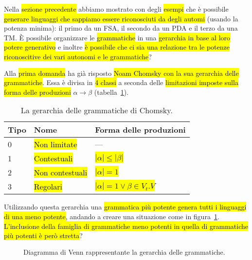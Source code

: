 \documentclass[a4paper,11pt,oneside]{article}
\theoremstyle{plain}
\theoremstyle{definition}
\theoremstyle{remark}
\begin{document}
Nella \hl{sezione precedente} abbiamo mostrato con degli \hl{esempi} che è
possibile \hl{generare linguaggi che sappiamo essere riconosciuti da degli
automi} (usando la potenza minima): il primo da un FSA, il secondo da un PDA e
il terzo da una TM\@. È possibile organizzare le \hl{grammatiche} in una
\hl{gerarchia in base al loro potere generativo} e inoltre \hl{è possibile che
ci sia una relazione tra le potenze riconoscitive dei vari autonomi e le
grammatiche}?

Alla \hl{prima domanda} ha già risposto \hl{Noam Chomsky con la sua gerarchia
delle grammatiche}. Essa è divisa in \hl{4 classi} a seconda delle
\hl{limitazioni imposte sulla forma delle produzioni} $\alpha \to \beta$
(tabella~\ref{tab:gerarchia-grammatiche}).

\begin{table}[htb]
  \centering
  \begin{tabular}{lll}
    \toprule
    Tipo & Nome            & Forma delle produzioni \\
    \midrule
    0    & \hl{Non limitate}    & --- \\
    1    & \hl{Contestuali}     & \hl{$|\alpha| \leq |\beta|$} \\
    2    & \hl{Non contestuali} & \hl{$|\alpha| = 1$} \\
    3    & \hl{Regolari}        & \hl{$|\alpha| = 1 \vee \beta \in V_t . V$} \\
    \bottomrule
  \end{tabular}
  \caption{La gerarchia delle grammatiche di Chomsky.}%
  \label{tab:gerarchia-grammatiche}
\end{table}

Utilizzando questa gerarchia una \hl{grammatica più potente genera tutti i
linguaggi di una meno potente}, andando a creare una situazione come in
figura~\ref{fig:gerarchia-grammatiche}. \hl{L'inclusione della famiglia di
grammatiche meno potenti in quella di grammatiche più potenti è però stretta}?

\begin{figure}[htb]
  \centering
  \caption{Diagramma di Venn rappresentante la gerarchia delle grammatiche.}%
  \label{fig:gerarchia-grammatiche}
\end{figure}
\end{document}
